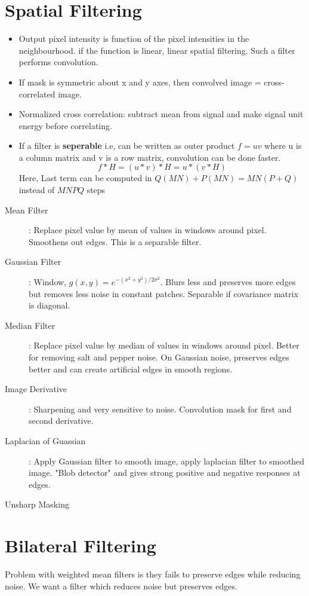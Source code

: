 \documentclass[a4paper]{article}
\begin{document}
\section{Spatial Filtering}
\begin{itemize}[leftmargin=0pt]
\item[] Output pixel intensity is function of the pixel intensities in the neighbourhood. if the function is linear, linear spatial filtering. Such a filter performs convolution.
\item[] If mask is symmetric about x and y axes, then convolved image = cross-correlated image. 
\item[] Normalized cross correlation: subtract mean from signal and make signal unit energy before correlating.
\item[] If a filter is \textbf{seperable} i.e, can be written as outer product $f = u v$ where u is a column matrix and v is a row matrix, convolution can be done faster. $$f*H = (u*v)*H = u*(v*H)$$
Here, Last term can be computed in $Q(MN)+P(MN) = MN(P+Q)$ instead of $MNPQ$ steps
\end{itemize}


\begin{description}
\item[Mean Filter]: Replace pixel value by mean of values in windows around pixel. Smoothens out edges. This is a separable filter.
\item[Gaussian Filter]: Window, $g(x,y) = e^{-(x^2+y^2)/2\sigma^2}$. Blurs less and preserves more edges but removes less noise in constant patches. Separable if covariance matrix is diagonal.
\item[Median Filter]: Replace pixel value by median of values in windows around pixel. Better for removing salt and pepper noise. On Gaussian noise, preserves edges better and can create artificial edges in smooth regions.
\item[Image Derivative]: Sharpening and very sensitive to noise. Convolution mask for first and second derivative.
\item[Laplacian of Guassian]: Apply Gaussian filter to smooth image, apply laplacian filter to smoothed image. "Blob detector" and gives strong positive and negative responses at edges.
\item[Unsharp Masking]
\end{description}

\section{Bilateral Filtering}
Problem with weighted mean filters is they fails to preserve edges while reducing noise. We want a filter which reduces noise but preserves edges.
\end{document}
